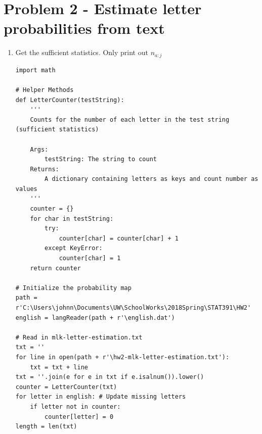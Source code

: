 \documentclass[preprint,12pt]{elsarticle}
\begin{document}
    \section{Problem 2 - Estimate letter probabilities from text}
    \begin{enumerate}
    \item Get the sufficient statistics. Only print out $n_{a:j}$
    \begin{lstlisting}
import math

# Helper Methods
def LetterCounter(testString):
    '''
    Counts for the number of each letter in the test string (sufficient statistics)

    Args:
        testString: The string to count
    Returns:
        A dictionary containing letters as keys and count number as values
    '''
    counter = {}
    for char in testString:
        try:
            counter[char] = counter[char] + 1
        except KeyError:
            counter[char] = 1
    return counter

# Initialize the probability map
path = r'C:\Users\johnn\Documents\UW\SchoolWorks\2018Spring\STAT391\HW2'
english = langReader(path + r'\english.dat')

# Read in mlk-letter-estimation.txt
txt = ''
for line in open(path + r'\hw2-mlk-letter-estimation.txt'):
    txt = txt + line
txt = ''.join(e for e in txt if e.isalnum()).lower()
counter = LetterCounter(txt)
for letter in english: # Update missing letters
    if letter not in counter:
        counter[letter] = 0
length = len(txt)


\end{lstlisting}
\end{enumerate}
\end{document}
